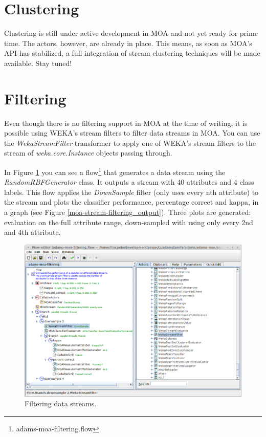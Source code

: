 \documentclass[a4paper]{book}
\begin{document}
\clearpage
\newpage
\section{Clustering}
Clustering is still under active development in MOA and not yet ready 
for prime time. The actors, however, are already in place. This means,
as soon as MOA's API has stabilized, a full integration of stream 
clustering techniques will be made available. Stay tuned!

\clearpage
\newpage
\section{Filtering}
Even though there is no filtering support in MOA at the time of writing, it is
possible using WEKA's stream filters to filter data streams in MOA.
You can use the \textit{WekaStreamFilter} transformer to apply one of WEKA's
stream filters to the stream of \textit{weka.core.Instance} objects passing
through.

In Figure \ref{moa-stream-filtering_flow} you can see a flow\footnote{adams-moa-filtering.flow} 
that generates a data stream using the \textit{RandomRBFGenerator} class. It
outputs a stream with 40 attributes and 4 class labels. This flow applies
the \textit{DownSample} filter (only uses every nth attribute) to the stream
and plots the classifier performance, percentage correct and kappa, in a graph
(see Figure \ref{moa-stream-filtering_output}). Three plots are generated: evaluation
on the full attribute range, down-sampled with using only every 2nd and 4th
attribute.

\begin{figure}[htb]
  \centering
  \includegraphics[width=12.0cm]{images/moa-stream-filtering_flow.png}
  \caption{Filtering data streams.}
  \label{moa-stream-filtering_flow}
\end{figure}
\end{document}
